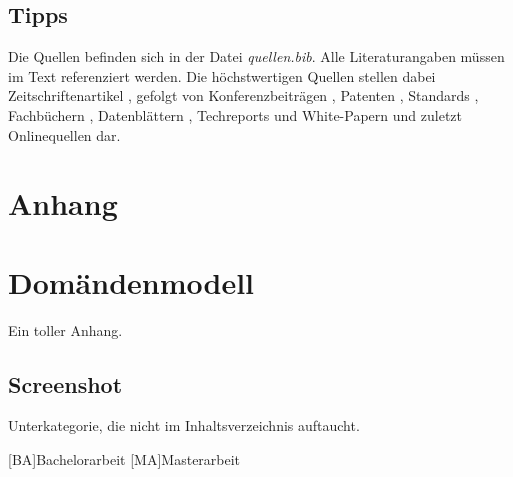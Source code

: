 \documentclass[12pt,a4paper,bibliography=totoc,listof=totoc]{scrartcl}
\begin{document}
\subsection{Tipps}
Die Quellen befinden sich in der Datei \textit{quellen.bib}. 
Alle Literaturangaben müssen im Text referenziert werden. Die höchstwertigen Quellen stellen dabei Zeitschriftenartikel \cite{Laprie2004}, gefolgt von Konferenzbeiträgen \cite{Agrou2011}, Patenten \cite{Grisenthwaite2012}, Standards \cite{ARINC2005}, Fachbüchern \cite{Kopetz2011},  Datenblättern \cite{Freescale2015}, Techreports und White-Papern \cite{Aswadhati2011} und zuletzt Onlinequellen \cite{Xil2010} dar.

\pagebreak



\setcounter{page}{1}

\begin{appendix}
\section*{Anhang}
{}

\section{Domändenmodell}
Ein toller Anhang.

\subsection*{Screenshot}
\label{app:screenshot}
Unterkategorie, die nicht im Inhaltsverzeichnis auftaucht.
\pagebreak

\end{appendix}
\pagebreak

\begin{acronym}[KDE]
	[BA]{Bachelorarbeit}
	[MA]{Masterarbeit}
\end{acronym}
\pagebreak
\end{document}
